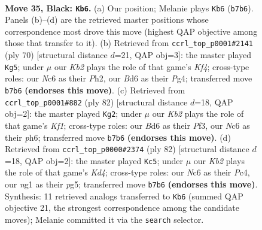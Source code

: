 \documentclass[11pt]{article}
\begin{document}
\clearpage

\begin{figure}[p]\centering
\begin{subfigure}{0.46\textwidth}\centering
\resizebox{\linewidth}{!}{%
\newchessgame
\chessboard[
  setfen={8/1k6/2nb2p1/6P1/p1b4B/8/8/4K1N1 b - - 5 35},
  showmover=false,
  pgfstyle=straightmove, color=movearrow, markmove={b7-b6}
]}
\caption{}
\end{subfigure}\hfill
\begin{subfigure}{0.46\textwidth}\centering
\resizebox{\linewidth}{!}{%
\newchessgame
\chessboard[
  setfen={6k1/7p/1p1B4/8/2b2KP1/1p6/1P5P/8 w - - 0 36},
  showmover=false,
  pgfstyle=straightmove, color=movearrow, markmove={f4-g5}
]}
\caption{}
\end{subfigure}
\\[4pt]
\begin{subfigure}{0.46\textwidth}\centering
\resizebox{\linewidth}{!}{%
\newchessgame
\chessboard[
  setfen={2B2k2/5p2/7p/8/1b3p2/5P2/7P/5K2 w - - 0 42},
  showmover=false,
  pgfstyle=straightmove, color=movearrow, markmove={f1-g2}
]}
\caption{}
\end{subfigure}\hfill
\begin{subfigure}{0.46\textwidth}\centering
\resizebox{\linewidth}{!}{%
\newchessgame
\chessboard[
  setfen={8/8/8/5kp1/p1PK4/6Bb/1P6/8 w - - 0 42},
  showmover=false,
  pgfstyle=straightmove, color=movearrow, markmove={d4-c5}
]}
\caption{}
\end{subfigure}
\caption{\textbf{Move 35, Black: \texttt{Kb6}.} (a) Our position; Melanie plays \texttt{Kb6} (\texttt{b7b6}). Panels (b)--(d) are the retrieved master positions whose correspondence most drove this move (highest QAP objective among those that transfer to it). (b) Retrieved from \texttt{ccrl\_top\_p0001\#2141} (ply 70) [structural distance $d$=21, QAP obj=3]: the master played \texttt{Kg5}; under $\mu$ our \emph{Kb2} plays the role of that game's \emph{Kf4}; cross-type roles: our \emph{N}c6 as their \emph{P}h2, our \emph{B}d6 as their \emph{P}g4; transferred move \texttt{b7b6} \textbf{(endorses this move)}. (c) Retrieved from \texttt{ccrl\_top\_p0001\#882} (ply 82) [structural distance $d$=18, QAP obj=2]: the master played \texttt{Kg2}; under $\mu$ our \emph{Kb2} plays the role of that game's \emph{Kf1}; cross-type roles: our \emph{B}d6 as their \emph{P}f3, our \emph{N}c6 as their \emph{p}h6; transferred move \texttt{b7b6} \textbf{(endorses this move)}. (d) Retrieved from \texttt{ccrl\_top\_p0000\#2374} (ply 82) [structural distance $d$=18, QAP obj=2]: the master played \texttt{Kc5}; under $\mu$ our \emph{Kb2} plays the role of that game's \emph{Kd4}; cross-type roles: our \emph{N}c6 as their \emph{P}c4, our \emph{n}g1 as their \emph{p}g5; transferred move \texttt{b7b6} \textbf{(endorses this move)}. Synthesis: 11 retrieved analogs transferred to \texttt{Kb6} (summed QAP objective 21, the strongest correspondence among the candidate moves); Melanie committed it via the \texttt{search} selector.}
\label{fig:thought-m69}
\end{figure}
\end{document}
